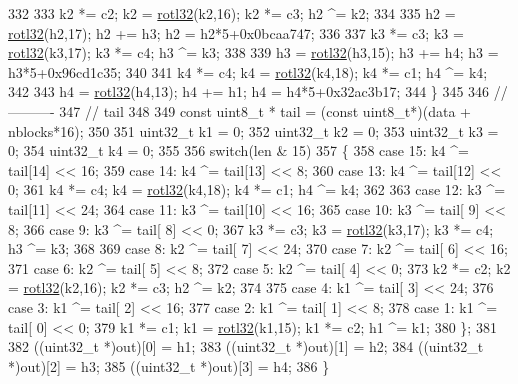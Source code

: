 \begin{DoxyCode}
332 
333     k2 *= c2; k2  = \hyperlink{group__hash__murmur3_ga5ad09e63b7268f407b727713d0f6687a}{rotl32}(k2,16); k2 *= c3; h2 ^= k2;
334 
335     h2 = \hyperlink{group__hash__murmur3_ga5ad09e63b7268f407b727713d0f6687a}{rotl32}(h2,17); h2 += h3; h2 = h2*5+0x0bcaa747;
336 
337     k3 *= c3; k3  = \hyperlink{group__hash__murmur3_ga5ad09e63b7268f407b727713d0f6687a}{rotl32}(k3,17); k3 *= c4; h3 ^= k3;
338 
339     h3 = \hyperlink{group__hash__murmur3_ga5ad09e63b7268f407b727713d0f6687a}{rotl32}(h3,15); h3 += h4; h3 = h3*5+0x96cd1c35;
340 
341     k4 *= c4; k4  = \hyperlink{group__hash__murmur3_ga5ad09e63b7268f407b727713d0f6687a}{rotl32}(k4,18); k4 *= c1; h4 ^= k4;
342 
343     h4 = \hyperlink{group__hash__murmur3_ga5ad09e63b7268f407b727713d0f6687a}{rotl32}(h4,13); h4 += h1; h4 = h4*5+0x32ac3b17;
344   \}
345 
346   \textcolor{comment}{//----------}
347   \textcolor{comment}{// tail}
348 
349   \textcolor{keyword}{const} uint8\_t * tail = (\textcolor{keyword}{const} uint8\_t*)(data + nblocks*16);
350 
351   uint32\_t k1 = 0;
352   uint32\_t k2 = 0;
353   uint32\_t k3 = 0;
354   uint32\_t k4 = 0;
355 
356   \textcolor{keywordflow}{switch}(len & 15)
357   \{
358   \textcolor{keywordflow}{case} 15: k4 ^= tail[14] << 16;
359   \textcolor{keywordflow}{case} 14: k4 ^= tail[13] << 8;
360   \textcolor{keywordflow}{case} 13: k4 ^= tail[12] << 0;
361            k4 *= c4; k4  = \hyperlink{group__hash__murmur3_ga5ad09e63b7268f407b727713d0f6687a}{rotl32}(k4,18); k4 *= c1; h4 ^= k4;
362 
363   \textcolor{keywordflow}{case} 12: k3 ^= tail[11] << 24;
364   \textcolor{keywordflow}{case} 11: k3 ^= tail[10] << 16;
365   \textcolor{keywordflow}{case} 10: k3 ^= tail[ 9] << 8;
366   \textcolor{keywordflow}{case}  9: k3 ^= tail[ 8] << 0;
367            k3 *= c3; k3  = \hyperlink{group__hash__murmur3_ga5ad09e63b7268f407b727713d0f6687a}{rotl32}(k3,17); k3 *= c4; h3 ^= k3;
368 
369   \textcolor{keywordflow}{case}  8: k2 ^= tail[ 7] << 24;
370   \textcolor{keywordflow}{case}  7: k2 ^= tail[ 6] << 16;
371   \textcolor{keywordflow}{case}  6: k2 ^= tail[ 5] << 8;
372   \textcolor{keywordflow}{case}  5: k2 ^= tail[ 4] << 0;
373            k2 *= c2; k2  = \hyperlink{group__hash__murmur3_ga5ad09e63b7268f407b727713d0f6687a}{rotl32}(k2,16); k2 *= c3; h2 ^= k2;
374 
375   \textcolor{keywordflow}{case}  4: k1 ^= tail[ 3] << 24;
376   \textcolor{keywordflow}{case}  3: k1 ^= tail[ 2] << 16;
377   \textcolor{keywordflow}{case}  2: k1 ^= tail[ 1] << 8;
378   \textcolor{keywordflow}{case}  1: k1 ^= tail[ 0] << 0;
379            k1 *= c1; k1  = \hyperlink{group__hash__murmur3_ga5ad09e63b7268f407b727713d0f6687a}{rotl32}(k1,15); k1 *= c2; h1 ^= k1;
380   \};
381 
382   ((uint32\_t *)out)[0] = h1;
383   ((uint32\_t *)out)[1] = h2;
384   ((uint32\_t *)out)[2] = h3;
385   ((uint32\_t *)out)[3] = h4;
386 \}
\end{DoxyCode}


